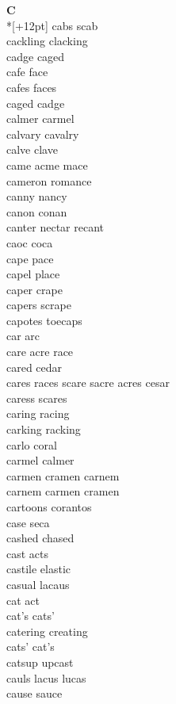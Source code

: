 \vspace{14pt}
\noindent\textbf{\Large C}\\*[+12pt]
cabs scab\\
cackling clacking\\
cadge caged\\
cafe face\\
cafes faces\\
caged cadge\\
calmer carmel\\
calvary cavalry\\
calve clave\\
came acme mace\\
cameron romance\\
canny nancy\\
canon conan\\
canter nectar recant\\
caoc coca\\
cape pace\\
capel place\\
caper crape\\
capers scrape\\
capotes toecaps\\
car arc\\
care acre race\\
cared cedar\\
cares races scare sacre acres cesar\\
caress scares\\
caring racing\\
carking racking\\
carlo coral\\
carmel calmer\\
carmen cramen carnem\\
carnem carmen cramen\\
cartoons corantos\\
case seca\\
cashed chased\\
cast acts\\
castile elastic\\
casual lacaus\\
cat act\\
cat's cats'\\
catering creating\\
cats' cat's\\
catsup upcast\\
cauls lacus lucas\\
cause sauce\\
